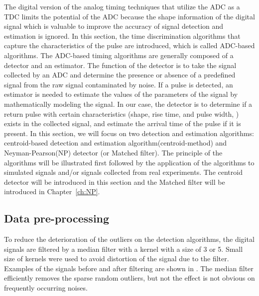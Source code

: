 



The digital version of the analog timing techniques that utilize the ADC as a TDC limits the potential of the ADC because the shape information of the digital signal which is valuable to improve the accuracy of signal detection and estimation is ignored. In this section, the time discrimination algorithms that capture the characteristics of the pulse are introduced, which is called ADC-based algorithms. The ADC-based timing algorithms are generally composed of a detector and an estimator. The function of the detector is to take the signal collected by an ADC and determine the presence or absence of a predefined signal from the raw signal contaminated by noise. If a pulse is detected, an estimator is needed to estimate the values of the parameters of the signal by mathematically modeling the signal. In our case, the detector is to determine if a return pulse with certain characteristics (\ie shape, rise time, and pulse width, \etc) exists in the collected signal, and estimate the arrival time of the pulse if it is present. In this section, we will focus on two detection and estimation algorithms: centroid-based detection and estimation algorithm(centroid-method) and Neyman-Pearson(NP) detector (or Matched filter). The principle of the algorithms will be illustrated first followed by the application of the algorithms to simulated signals and/or signals collected from real experiments. The centroid detector will be introduced in this section and the Matched filter will be introduced in Chapter~\ref{ch:NP}.

\subsection{Data pre-processing}
To reduce the deterioration of the outliers on the detection algorithms, the digital signals are filtered by a median filter with a kernel with a size of 3 or 5. Small size of kernels were used to avoid distortion of the signal due to the filter. Examples of the signals before and after filtering are shown in . The median filter efficiently removes the sparse random outliers, but not the effect is not obvious on frequently occurring noises. %

